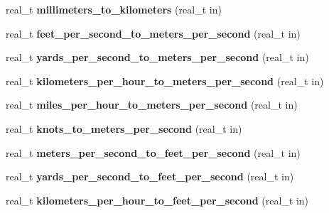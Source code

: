 \begin{DoxyCompactItemize}
\item 
\hypertarget{namespaceetk_ac0d802c89a5f3f3f03f784b41ace0a6a}{real\-\_\-t {\bfseries millimeters\-\_\-to\-\_\-kilometers} (real\-\_\-t in)}\label{namespaceetk_ac0d802c89a5f3f3f03f784b41ace0a6a}

\item 
\hypertarget{namespaceetk_a45d0b18cd1d45168889b657b80882a1a}{real\-\_\-t {\bfseries feet\-\_\-per\-\_\-second\-\_\-to\-\_\-meters\-\_\-per\-\_\-second} (real\-\_\-t in)}\label{namespaceetk_a45d0b18cd1d45168889b657b80882a1a}

\item 
\hypertarget{namespaceetk_aec816378de0d170ada718d231e6471bf}{real\-\_\-t {\bfseries yards\-\_\-per\-\_\-second\-\_\-to\-\_\-meters\-\_\-per\-\_\-second} (real\-\_\-t in)}\label{namespaceetk_aec816378de0d170ada718d231e6471bf}

\item 
\hypertarget{namespaceetk_a059cd1d516d20a25521595b1d6b55faa}{real\-\_\-t {\bfseries kilometers\-\_\-per\-\_\-hour\-\_\-to\-\_\-meters\-\_\-per\-\_\-second} (real\-\_\-t in)}\label{namespaceetk_a059cd1d516d20a25521595b1d6b55faa}

\item 
\hypertarget{namespaceetk_ad967ce680465a5b0facb8965fc170fc7}{real\-\_\-t {\bfseries miles\-\_\-per\-\_\-hour\-\_\-to\-\_\-meters\-\_\-per\-\_\-second} (real\-\_\-t in)}\label{namespaceetk_ad967ce680465a5b0facb8965fc170fc7}

\item 
\hypertarget{namespaceetk_ab8021b4aa3c8e0afe41c8a1b82b8d584}{real\-\_\-t {\bfseries knots\-\_\-to\-\_\-meters\-\_\-per\-\_\-second} (real\-\_\-t in)}\label{namespaceetk_ab8021b4aa3c8e0afe41c8a1b82b8d584}

\item 
\hypertarget{namespaceetk_aebd831e9e62d11c65ee7c4e375b3b978}{real\-\_\-t {\bfseries meters\-\_\-per\-\_\-second\-\_\-to\-\_\-feet\-\_\-per\-\_\-second} (real\-\_\-t in)}\label{namespaceetk_aebd831e9e62d11c65ee7c4e375b3b978}

\item 
\hypertarget{namespaceetk_aa137aadb04166308a245baf914b62ddc}{real\-\_\-t {\bfseries yards\-\_\-per\-\_\-second\-\_\-to\-\_\-feet\-\_\-per\-\_\-second} (real\-\_\-t in)}\label{namespaceetk_aa137aadb04166308a245baf914b62ddc}

\item 
\hypertarget{namespaceetk_a636968d74cdd49cc8af75c15a9b99d01}{real\-\_\-t {\bfseries kilometers\-\_\-per\-\_\-hour\-\_\-to\-\_\-feet\-\_\-per\-\_\-second} (real\-\_\-t in)}\label{namespaceetk_a636968d74cdd49cc8af75c15a9b99d01}


\end{DoxyCompactItemize}
